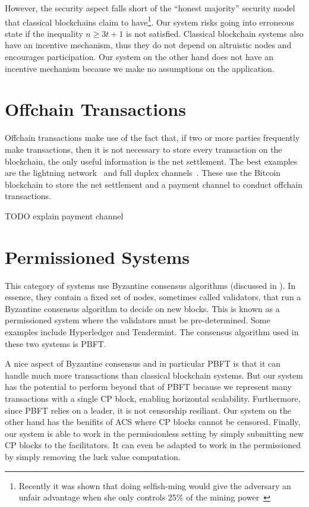 However, the security aspect falls short of the ``honest majority'' security model that classical blockchains claim to 
have\footnote{Recently it was shown that doing selfish-ming would give the adversary an unfair advantage when she only controls 25\% of the mining power~\cite{eyal2014majority}}.
Our system risks going into erroneous state if the inequality $n \ge 3t + 1$ is not satisfied.
Classical blockchain systems also have an incentive mechanism, thus they do not depend on altruistic nodes and encourages participation.
Our system on the other hand does not have an incentive mechanism because we make no assumptions on the application.

\section{Offchain Transactions}
Offchain transactions make use of the fact that, if two or more parties frequently make transactions,
then it is not necessary to store every transaction on the blockchain, the only useful information is the net settlement.
The best examples are the lightning network~\cite{lightningnetwork} and full duplex channels~\cite{decker2015fast}.
These use the Bitcoin blockchain to store the net settlement and a payment channel to conduct offchain transactions.

TODO explain payment channel


\section{Permissioned Systems}

This category of systems use Byzantine consensus algorithms (discussed in ).
In essence, they contain a fixed set of nodes, sometimes called validators,
that run a Byzantine consensus algorithm to decide on new blocks.
This is known as a permissioned system where the validators must be pre-determined.
Some examples include Hyperledger and Tendermint.
The consensus algorithm used in these two systems is PBFT.

A nice aspect of Byzantine consensus and in particular PBFT is that it can handle much more transactions than classical blockchain systems.
But our system has the potential to perform beyond that of PBFT because we represent many transactions with a single CP block,
enabling horizontal scalability.
Furthermore, since PBFT relies on a leader, it is not censorship resiliant.
Our system on the other hand has the benifits of ACS where CP blocks cannot be censored.
Finally, our system is able to work in the permissionless setting by simply submitting new CP blocks to the facilitators.
It can even be adapted to work in the permissioned by simply removing the luck value computation.

